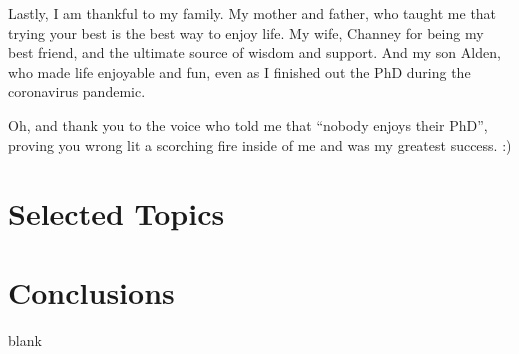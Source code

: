 \documentclass[12pt]{../include/ucthesis}
\begin{document}
\begin{frontmatter}
\begin{acknowledgements}
    Lastly, I am thankful to my family. My mother and father, who taught me that trying your best is the best way to enjoy life. My wife, Channey for being my best friend, and the ultimate source of wisdom and support. And my son Alden, who made life enjoyable and fun, even as I finished out the PhD during the coronavirus pandemic.

    Oh, and thank you to the voice who told me that ``nobody enjoys their PhD'', proving you wrong lit a scorching fire inside of me and was my greatest success. :)
\end{acknowledgements}

\end{frontmatter}

















\chapter{Selected Topics}






\chapter{Conclusions}
blank

\appendix




% 


\nocite{*}
% 

\singlespacing


\doublespacing
\end{document}

